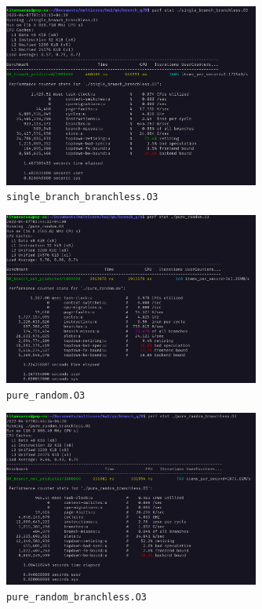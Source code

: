 \documentclass[12pt]{article}
\begin{document}
\begin{itemize}
\begin{figure}[H]
	\centering
	\includegraphics[width=0.75\textwidth]{./images/4D/single-branch-b.png}	
	\cprotect\caption{\Verb+single_branch_branchless.O3+}
\end{figure}


\begin{figure}[H]
	\centering
	\includegraphics[width=0.75\textwidth]{./images/4D/pure-random.png}	
	\cprotect\caption{\Verb+pure_random.O3+}
\end{figure}


\begin{figure}[H]
	\centering
	\includegraphics[width=0.75\textwidth]{./images/4D/pure-random-b.png}	
	\cprotect\caption{\Verb+pure_random_branchless.O3+}
\end{figure}



\end{itemize}
\end{document}
